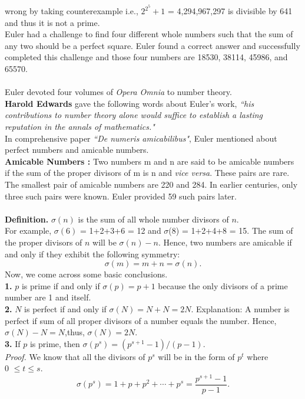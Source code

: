 \documentclass[a4paper,11pt]{article}
\begin{document}
wrong by taking counterexample i.e., $2^{2^5}+1$
 = 4,294,967,297 is divisible by 641 and thus it is not a prime.\\
Euler had a challenge to find four different whole numbers such that the sum 
of any two should be a perfect square. Euler found a correct answer and successfully completed this challenge and those four numbers are 18530, 
38114, 45986, and 65570.\\
\\
Euler devoted four volumes of \textit{Opera Omnia} to number theory.\\ \textbf{Harold Edwards} gave the following words about Euler's work, \textit{``his contributions to number theory alone would suffice 
to establish a lasting reputation in the annals of mathematics."}\\
In comprehensive paper \textit{``De numeris amicabilibus"}, Euler mentioned about perfect numbers and amicable numbers.\\
\textbf{Amicable Numbers : } Two numbers m and n are said to be amicable numbers if the sum of the proper divisors of m is n and \textit{vice versa}. These pairs are rare. The smallest pair of amicable numbers are 
220 and 284. In earlier centuries, only three such pairs were known. Euler provided 59 such pairs later.\\
\\
\textbf{Definition.} $\sigma(n)$ is the sum of all whole number divisors of $n$.\\
For example, $\sigma(6)$ = 1+2+3+6 = 12 and $\sigma$(8) = 1+2+4+8 = 15.
The sum of the proper divisors of $n$ will be $\sigma(n) - n$. Hence, two numbers are amicable if and only if they exhibit the following symmetry:
$$\sigma(m) = m+n = \sigma(n).$$
Now, we come across some basic conclusions.\\
\textbf{1.} $p$ is prime if and only if $\sigma(p) = p + 1$ because the only divisors of a prime number are 1 and itself.\\
\textbf{2.} $N$ is perfect if and only if $\sigma(N) = N + N = 2N$. Explanation: A number is perfect if sum of all proper divisors of a number equals the number.
Hence, $\sigma(N) - N = N$,thus, $\sigma(N) = 2N.$\\
\textbf{3.} If $p$ is prime, then $\sigma(p^s) = (p^{s+1} - 1 )/(p - 1)$.\\
\textit{Proof.} We know that all the divisors of $p^s$ will be in the form of $p^t$ where\\ 0 $\leq t \leq s.$\\
$$\sigma(p^s) = 1 + p + p^2 + \cdots + p^s = \frac{p^{s+1} - 1}{p-1}. $$
\end{document}
